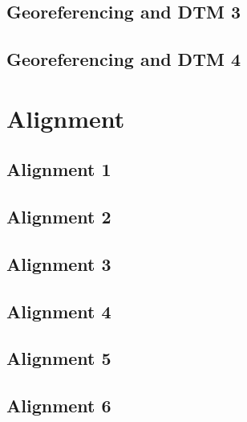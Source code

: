 \documentclass{scrartcl}
\begin{document}
\subsection{Georeferencing and DTM 3} %
\label{sec:georef_tin_3}
\clearpage

\subsection{Georeferencing and DTM 4} %
\label{sec:georef_tin_4}
\clearpage

\section{Alignment}
\label{sec:alignment}

\subsection{Alignment 1}
\label{sec:align_1}
\clearpage

\subsection{Alignment 2}
\label{sec:align_2}
\clearpage

\subsection{Alignment 3}
\label{sec:align_3}
\clearpage

\subsection{Alignment 4}
\label{sec:align_4}
\clearpage

\subsection{Alignment 5}
\label{sec:align_5}
\clearpage

\subsection{Alignment 6} %
\label{sec:align_6}
\clearpage
\end{document}
